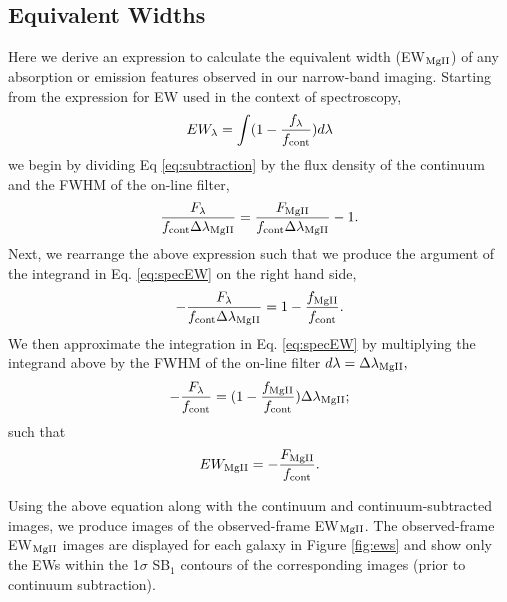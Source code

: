 \documentclass[twocolumn]{aastex61}
\begin{document}
\subsection{Equivalent Widths}\label{subsec.ew}
Here we derive an expression to calculate the equivalent width (EW$_{\rm{MgII}}$) of any absorption or emission features observed in our narrow-band imaging. Starting from the expression for EW used in the context of spectroscopy,
\begin{equation}
EW_{\lambda}=\int (1-\frac{f_{\lambda}}{f_{\rm{cont}}})d\lambda
\label{eq:specEW}
\end{equation}
we begin by dividing Eq \ref{eq:subtraction} by the flux density of the continuum and the FWHM of the on-line filter,
\begin{equation}
\frac{F_{\lambda}}{f_{\rm{cont}}\Delta \lambda_{\rm{MgII}}}=\frac{F_{\rm{MgII}}}{f_{\rm{cont}}\Delta \lambda_{\rm{MgII}}}- 1.
\end{equation}
Next, we rearrange the above expression such that we produce the argument of the integrand in Eq. \ref{eq:specEW} on the right hand side,
\begin{equation}
-\frac{F_{\lambda}}{f_{\rm{cont}}\Delta \lambda_{\rm{MgII}}}=1-\frac{f_{\rm{MgII}}}{f_{\rm{cont}}}.
\end{equation}
We then approximate the integration in Eq. \ref{eq:specEW} by multiplying the integrand above by the FWHM of the on-line filter $d\lambda=\Delta \lambda_{\rm{MgII}},$
\begin{equation}
-\frac{F_{\lambda}}{f_{\rm{cont}}}=(1-\frac{f_{\rm{MgII}}}{f_{\rm{cont}}})\Delta \lambda_{\rm{MgII}};
\end{equation}
such that
\begin{equation}
EW_{\rm{MgII}}=-\frac{F_{\rm{MgII}}}{f_{\rm{cont}}}.
\end{equation}

Using the above equation along with the continuum and continuum-subtracted images, we produce images of the observed-frame EW$_{\rm{MgII}}$. The observed-frame EW$_{\rm{MgII}}$ images are displayed for each galaxy in Figure \ref{fig:ews} and show only the EWs within the 1$\sigma$ SB$_1$ contours of the corresponding  images (prior to continuum subtraction). 
\end{document}
